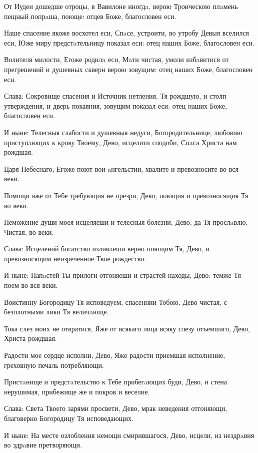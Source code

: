 

От Иудеи дошедше отроцы, в Вавилоне иногдa, верою Троическою плaмень пещный попрaша, поюще: отцев Боже, благословен еси.


Наше спасение якоже восхотел еси, Спaсе, устроити, во утробу Девыя вселился еси, Юже миру предстaтельницу показал еси: отец наших Боже, благословен еси.


Волителя милости, Егоже родилa еси, Мaти чистая, умоли избaвитися от прегрешений и душевных скверн верою зовущим: отец наших Боже, благословен еси.


Слава: Сокровище спасения и Источник нетления, Тя рождшую, и столп утверждения, и дверь покаяния, зовущим показал еси: отец наших Боже, благословен еси.


И ныне: Телесныя слабости и душевныя недуги, Богородительнице, любовию приступaющих к крову Твоему, Дево, исцелити сподоби, Спaса Христа нам рождшая.



Царя Небеснаго, Егоже поют вои aнгельстии, хвалите и превозносите во вся веки.

Помощи яже от Тебе требующия не презри, Дево, поющия и превозносящия Тя во веки.

Неможение души моея исцеляеши и телесныя болезни, Дево, да Тя прослaвлю, Чистая, во веки.

Слава: Исцелений богатство изливaеши верно поющим Тя, Дево, и превозносящим неизреченное Твое рождество.

И ныне: Напaстей Ты прилоги отгоняеши и страстей находы, Дево: темже Тя поем во вся веки.



Воистинну Богородицу Тя исповедуем, спасеннии Тобою, Дево чистая, с безплотными лики Тя величaюще.

Тока слез моих не отвратися, Яже от всякаго лица всяку слезу отъемшаго, Дево, Христа рождшая.

Радости мое сердце исполни, Дево, Яже радости приемшая исполнение, греховную печаль потребляющи.


Пристaнище и предстaтельство к Тебе прибегaющих буди, Дево, и стена нерушимая, прибежище же и покров и веселие.

Слава: Света Твоего зарями просвети, Дево, мрак неведения отгоняющи, благоверно Богородицу Тя исповедающих.

И ныне: На месте озлобления немощи смирившагося, Дево, исцели, из нездрaвия во здрaвие претворяющи.


